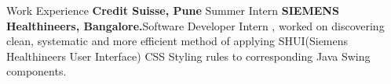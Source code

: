 \begin{rubric}{Work Experience}
%
	\textbf{Credit Suisse, Pune} Summer Intern
%
%
%
	\textbf{SIEMENS Healthineers, Bangalore.}Software Developer Intern , worked on discovering clean, systematic and more efficient method of applying SHUI(Siemens Healthineers User Interface) CSS Styling rules to corresponding Java Swing components. 
%
\end{rubric}